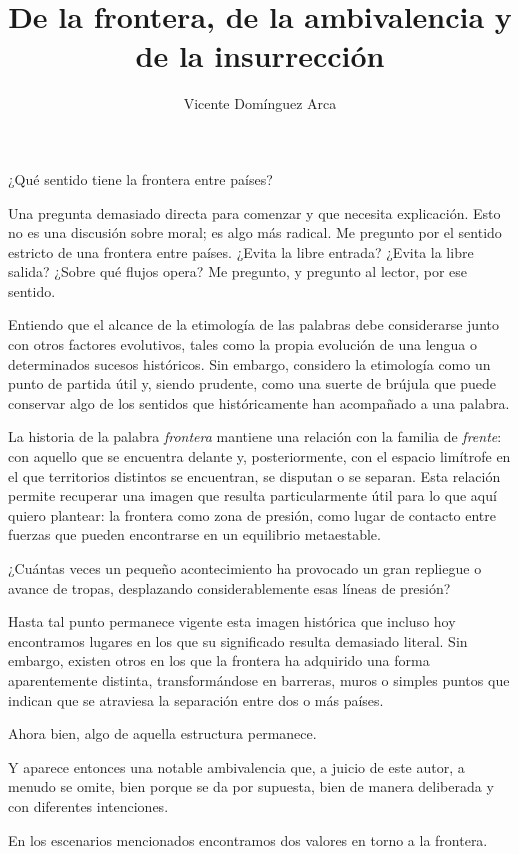 \documentclass[12pt,a4paper]{article}
\title{De la frontera, de la ambivalencia y de la insurrección}
\author{Vicente Domínguez Arca}
\date{}
\begin{document}
\maketitle

¿Qué sentido tiene la frontera entre países?

Una pregunta demasiado directa para comenzar y que necesita explicación. Esto no es una discusión sobre moral; es algo más radical. Me pregunto por el sentido estricto de una frontera entre países. ¿Evita la libre entrada? ¿Evita la libre salida? ¿Sobre qué flujos opera? Me pregunto, y pregunto al lector, por ese sentido.

Entiendo que el alcance de la etimología de las palabras debe considerarse junto con otros factores evolutivos, tales como la propia evolución de una lengua o determinados sucesos históricos. Sin embargo, considero la etimología como un punto de partida útil y, siendo prudente, como una suerte de brújula que puede conservar algo de los sentidos que históricamente han acompañado a una palabra.

La historia de la palabra \emph{frontera} mantiene una relación con la familia de \emph{frente}: con aquello que se encuentra delante y, posteriormente, con el espacio limítrofe en el que territorios distintos se encuentran, se disputan o se separan. Esta relación permite recuperar una imagen que resulta particularmente útil para lo que aquí quiero plantear: la frontera como zona de presión, como lugar de contacto entre fuerzas que pueden encontrarse en un equilibrio metaestable.

¿Cuántas veces un pequeño acontecimiento ha provocado un gran repliegue o avance de tropas, desplazando considerablemente esas líneas de presión?

Hasta tal punto permanece vigente esta imagen histórica que incluso hoy encontramos lugares en los que su significado resulta demasiado literal. Sin embargo, existen otros en los que la frontera ha adquirido una forma aparentemente distinta, transformándose en barreras, muros o simples puntos que indican que se atraviesa la separación entre dos o más países.

Ahora bien, algo de aquella estructura permanece.

Y aparece entonces una notable ambivalencia que, a juicio de este autor, a menudo se omite, bien porque se da por supuesta, bien de manera deliberada y con diferentes intenciones.

En los escenarios mencionados encontramos dos valores en torno a la frontera.
\end{document}
